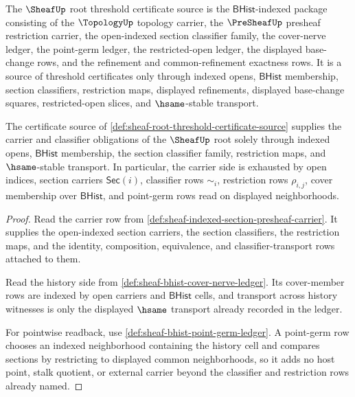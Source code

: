 \begin{definition}
\label{def:sheaf-root-threshold-certificate-source}
The $\SheafUp$ root threshold certificate source is the $\mathsf{BHist}$-indexed package consisting of the $\TopologyUp$ topology carrier, the $\PreSheafUp$ presheaf restriction carrier, the open-indexed section classifier family, the cover-nerve ledger, the point-germ ledger, the restricted-open ledger, the displayed base-change rows, and the refinement and common-refinement exactness rows. It is a source of threshold certificates only through indexed opens, $\mathsf{BHist}$ membership, section classifiers, restriction maps, displayed refinements, displayed base-change squares, restricted-open slices, and $\hsame$-stable transport.
\end{definition}

\begin{theorem}
\label{thm:sheaf-root-threshold-carrier-classifier-obligation}
The certificate source of \autoref{def:sheaf-root-threshold-certificate-source} supplies the carrier and classifier obligations of the $\SheafUp$ root solely through indexed opens, $\mathsf{BHist}$ membership, the section classifier family, restriction maps, and $\hsame$-stable transport. In particular, the carrier side is exhausted by open indices, section carriers $\mathsf{Sec}(i)$, classifier rows $\sim_i$, restriction rows $\rho_{i,j}$, cover membership over $\mathsf{BHist}$, and point-germ rows read on displayed neighborhoods.
\end{theorem}
\begin{proof}
Read the carrier row from \autoref{def:sheaf-indexed-section-presheaf-carrier}. It supplies the open-indexed section carriers, the section classifiers, the restriction maps, and the identity, composition, equivalence, and classifier-transport rows attached to them.

Read the history side from \autoref{def:sheaf-bhist-cover-nerve-ledger}. Its cover-member rows are indexed by open carriers and $\mathsf{BHist}$ cells, and transport across history witnesses is only the displayed $\hsame$ transport already recorded in the ledger.

For pointwise readback, use \autoref{def:sheaf-bhist-point-germ-ledger}. A point-germ row chooses an indexed neighborhood containing the history cell and compares sections by restricting to displayed common neighborhoods, so it adds no host point, stalk quotient, or external carrier beyond the classifier and restriction rows already named.
\end{proof}


